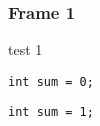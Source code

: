 \documentclass[ignorenonframetext]{beamer}
\begin{document}
\begin{frame}[fragile]

  \frametitle{Frame 1}

  test 1
\begin{lstlisting}
int sum = 0;
\end{lstlisting}

\end{frame}

\begin{lrbox}{\codebox}
\begin{lstlisting}
int sum = 1;
\end{lstlisting}
\end{lrbox}

\end{document}
